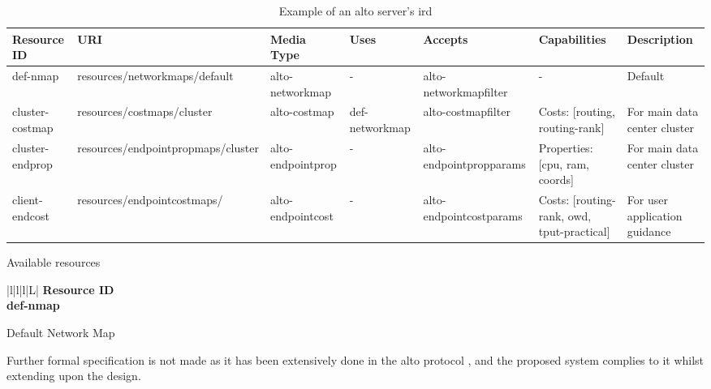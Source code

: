 \begin{table}[H]
        \begin{subtable}{1\linewidth}
        \centering
        \hspace*{-8em}
        \tiny
        \begin{tabular}{|l|l|l|l|l|l|l|}
        \hline
        Resource ID             & URI                                & Media Type        & Uses           & Accepts                 & Capabilities                                              & Description                                   \\ \hline
        def-nmap          & resources/networkmaps/default      & alto-networkmap   & -              & alto-networkmapfilter   & -                                                         & Default                           \\ \hline
        cluster-costmap         & resources/costmaps/cluster         & alto-costmap      & def-networkmap & alto-costmapfilter      & Costs: {[}routing, routing-rank{]} & For main data center cluster         \\ \hline
        cluster-endprop   & resources/endpointpropmaps/cluster & alto-endpointprop & -              & alto-endpointpropparams & Properties: {[}cpu, ram, coords{]} & For main data center cluster \\ \hline
        client-endcost & resources/endpointcostmaps/        & alto-endpointcost & -              & alto-endpointcostparams & Costs: {[}routing-rank, owd, tput-practical{]}            & For user application guidance       \\ \hline
        \end{tabular}
        \caption{Available resources}
        \end{subtable}
        \begin{subtable}{1\linewidth}
        \centering
        \begin{tabular}{|l|l|l|L|}
        \hline
        \bf{Resource ID} \\ \hline
        def-nmap         \\ \hline
        \end{tabular}
        \caption{Default Network Map}
        \end{subtable}

    \caption{Example of an \gls{alto} server's \gls{ird}}
    \label{table:ird-example}
\end{table}

Further formal specification is not made as it has been extensively done in the \gls{alto} protocol \cite{alto-protocol}, and the proposed system complies to it whilst extending upon the design.

